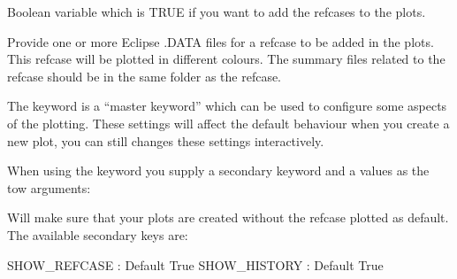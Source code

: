 \documentclass[letterpaper,10pt,english]{sphinxmanual}
\begin{document}
\label{\detokenize{keywords/index:plot-refcase}}
\begin{sphinxShadowBox}

Boolean variable which is TRUE if you want to add the refcases to the plots.


%
\begin{sphinxVerbatim}[commandchars=\\\{\}]
 
\end{sphinxVerbatim}
\end{sphinxShadowBox}

\begin{sphinxShadowBox}

Provide one or more Eclipse .DATA files for a refcase to be added in the
plots. This refcase will be plotted in different colours. The summary files
related to the refcase should be in the same folder as the refcase.


%
\begin{sphinxVerbatim}[commandchars=\\\{\}]
  
\end{sphinxVerbatim}
\end{sphinxShadowBox}
\label{\detokenize{keywords/index:plot-settings}}
\begin{sphinxShadowBox}

The  keyword is a “master keyword” which can be
used to configure some aspects of the plotting. These settings will
affect the default behaviour when you create a new plot, you can still
changes these settings interactively.

When using the  keyword you supply a secondary
keyword and a values as the tow arguments:

%
\begin{sphinxVerbatim}[commandchars=\\\{\}]
  
\end{sphinxVerbatim}

Will make sure that your plots are created without the refcase plotted
as default. The available secondary keys are:

SHOW\_REFCASE : Default True
SHOW\_HISTORY : Default True
\end{sphinxShadowBox}
\end{document}
